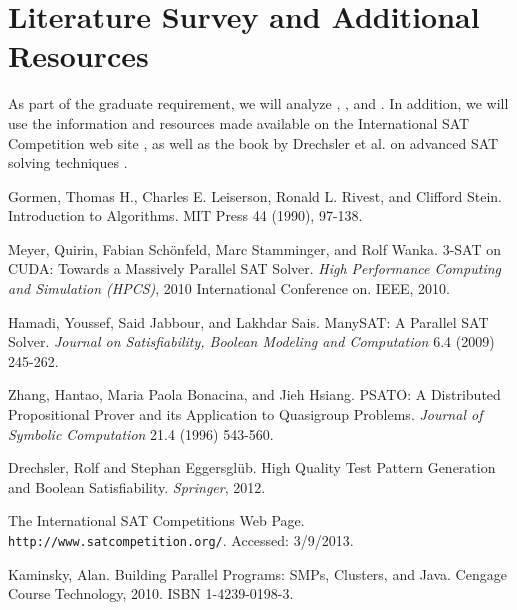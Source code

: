 \documentclass[paper=a4, fontsize=11pt]{scrartcl} %
\begin{document}
\section{Literature Survey and Additional Resources}
As part of the graduate requirement, we will analyze \cite{paper1}, \cite{paper2},
and \cite{paper3}. In addition, we will use the information and resources made available
on the International SAT Competition web site \cite{satCompetition}, as well
as the book by Drechsler et al. on advanced SAT solving techniques \cite{satBook}. 



\begin{thebibliography}{9}

 Gormen, Thomas H., Charles E. Leiserson, Ronald L. Rivest, and Clifford Stein. Introduction to Algorithms. MIT Press 44 (1990), 97-138.

 Meyer, Quirin, Fabian Sch\"{o}nfeld, Marc Stamminger, and Rolf Wanka. 3-SAT on CUDA: Towards a Massively Parallel SAT Solver. \emph{High Performance Computing and Simulation (HPCS)}, 2010 International Conference on. IEEE, 2010.

 Hamadi, Youssef, Said Jabbour, and Lakhdar Sais. ManySAT: A Parallel SAT Solver. \emph{Journal on Satisfiability, Boolean Modeling and Computation} 6.4 (2009) 245-262.

 Zhang, Hantao, Maria Paola Bonacina, and Jieh Hsiang. PSATO: A Distributed Propositional Prover and its Application to Quasigroup Problems. \emph{Journal of Symbolic Computation} 21.4 (1996) 543-560.

 Drechsler, Rolf and Stephan Eggersgl\"{u}b. High Quality Test Pattern Generation and Boolean Satisfiability. \emph{Springer}, 2012.

 The International SAT Competitions Web Page. {\tt http://www.satcompetition.org/}. Accessed: 3/9/2013.

 Kaminsky, Alan. Building Parallel Programs: SMPs, Clusters, and Java. Cengage Course Technology, 2010. ISBN 1-4239-0198-3.

\end{thebibliography}
\end{document}
